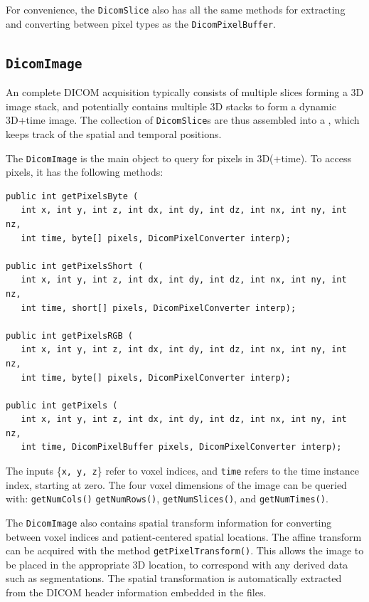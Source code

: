 For convenience, the \lstinline{DicomSlice} also has all the same methods 
for extracting and converting between pixel types as the \lstinline{DicomPixelBuffer}.

\subsection{\texttt{DicomImage}}

An complete DICOM acquisition typically consists of multiple slices forming a 3D image stack,
and potentially contains multiple 3D stacks to form a dynamic 3D+time image.  The collection
of \lstinline{DicomSlice}s are thus assembled into a , 
which keeps track of the spatial and temporal positions.

The \lstinline{DicomImage} is the main object to query for pixels in 3D(+time).  To access pixels,
it has the following methods:
\begin{lstlisting}[]
public int getPixelsByte (
   int x, int y, int z, int dx, int dy, int dz, int nx, int ny, int nz, 
   int time, byte[] pixels, DicomPixelConverter interp);

public int getPixelsShort (
   int x, int y, int z, int dx, int dy, int dz, int nx, int ny, int nz, 
   int time, short[] pixels, DicomPixelConverter interp);

public int getPixelsRGB (
   int x, int y, int z, int dx, int dy, int dz, int nx, int ny, int nz, 
   int time, byte[] pixels, DicomPixelConverter interp);

public int getPixels (
   int x, int y, int z, int dx, int dy, int dz, int nx, int ny, int nz, 
   int time, DicomPixelBuffer pixels, DicomPixelConverter interp);
\end{lstlisting}
The inputs \{\lstinline{x, y, z}\} refer to voxel indices, and \lstinline{time} refers to the time instance index, starting at zero.  The four voxel dimensions of the image can be queried with: \lstinline{getNumCols()} \lstinline{getNumRows()}, \lstinline{getNumSlices()}, and \lstinline{getNumTimes()}.

The \lstinline{DicomImage} also contains spatial transform information for converting between voxel indices and patient-centered spatial locations.  The affine transform can be acquired with the method \lstinline{getPixelTransform()}.  This allows the image to be placed in the appropriate 3D location, to correspond with any derived data such as segmentations.  The spatial transformation is automatically extracted from the DICOM header information embedded in the files.

